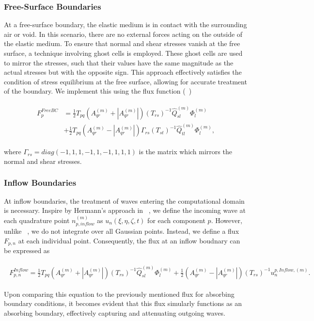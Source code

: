 \subsubsection{Free-Surface Boundaries}
At a free-surface boundary, the elastic medium is in contact with the surrounding air or void. In this scenario, there are no external forces
acting on the outside of the elastic medium. To ensure that normal and shear stresses vanish at the free surface, a technique involving
ghost cells is employed. These ghost cells are used to mirror the stresses, such that their values have the same magnitude as the actual
stresses but with the opposite sign. This approach effectively satisfies the condition of stress equilibrium at the free surface, allowing
for accurate treatment of the boundary. We implement this using the flux function (~\parencite{dumbser1})

\begin{align}
    \begin{split}
    F_{p}^{FreeBC} &= \frac{1}{2}T_{pq}\left(A_{qr}^{\left(m\right)} + \left|A_{qr}^{\left(m\right)}\right|\right) \left(T_{rs}\right)^{-1} \hat{Q}_{sl}^{\left(m\right)} \Phi_l^{\left(m\right)}
    \\ &+ \frac{1}{2} T_{pq} \left(A_{qr}^{\left(m\right)} - \left|A_{qr}^{\left(m\right)}\right|\right) \Gamma_{rs} \left(T_{st}\right)^{-1} \hat{Q}_{tl}^{\left(m\right)} \Phi_l^{\left(m\right)} ,
    \end{split}
\end{align}

where $\Gamma_{rs} = diag\left(-1,1,1,-1,1,-1,1,1,1\right)$ is the matrix which mirrors the normal and shear stresses.

\subsubsection{Inflow Boundaries}
At inflow boundaries, the treatment of waves entering the computational domain is necessary. Inspire by Hermann's approach in ~\parencite{hermann2010aderdg},
we define the incoming wave at each quadrature point $n_{p, inflow}^{\left(m\right)}$ as $u_n \left(\xi, \eta, \zeta, t\right)$ for 
each component $p$. However, unlike ~\parencite{hermann2010aderdg}, we do not integrate over all Gaussian points. Instead, we define
a flux $F_{p,n}$ at each individual point. Consequently, the flux at an inflow boudnary can be expressed as

\begin{align}
    \begin{split}
        F_{p,n}^{Inflow} = \frac{1}{2} T_{pq} \left(A_{qr}^{\left(m\right)} + \left|A_{qr}^{\left(m\right)}\right|\right) \left(T_{rs}\right)^{-1} \hat{Q}_{sl}^{\left(m\right)} \Phi_l^{\left(m\right)} 
        + \frac{1}{2}\left(A_{qr}^{\left(m\right)} - \left|A_{qr}^{\left(m\right)}\right|\right) \left(T_{rs}\right)^{-1} u_n^{p,Inflow,\left(m\right)} .
    \end{split}
\end{align}

Upon comparing this equation to the previously mentioned flux for absorbing boundary conditions, it becomes evident that this flux simularly
functions as an absorbing boundary, effectively capturing and attenuating outgoing waves.
